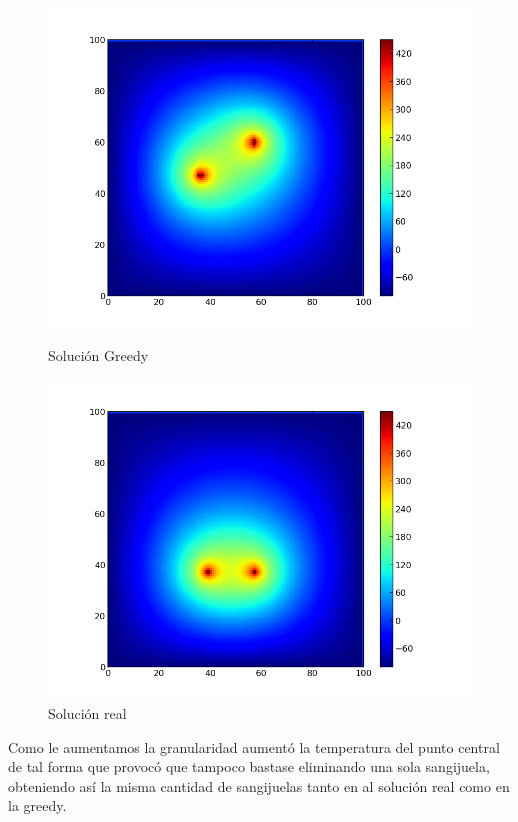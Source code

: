 \begin{figure}[htb]
\begin{center}
\includegraphics[scale=0.40]{imagenes/test6_g08_random_2.png} 
\caption{Solución Greedy} 

        \end{center}
\endminipage\hfill
{}
\begin{center}
\includegraphics[scale=0.40]{imagenes/test6_g08_random_3.png} 
\caption{Solución real} 
        \end{center}
\endminipage\hfill 
\end{figure}

Como le aumentamos la granularidad aumentó la temperatura del punto central de tal forma que provocó que tampoco bastase eliminando una sola sangijuela, obteniendo así la misma cantidad de sangijuelas tanto en al solución real como en la greedy.
